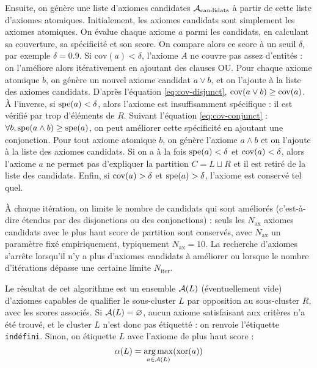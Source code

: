 Ensuite, on génère une liste d'axiomes candidates $\cal{A}_\text{candidats}$ à partir de cette liste d'axiomes atomiques. Initialement, les axiomes candidats sont simplement les axiomes atomiques. On évalue chaque axiome $a$ parmi les candidats, en calculant sa couverture, sa spécificité et son score. On compare alors ce score à un seuil $\delta$, par exemple $\delta = 0.9$. Si $\text{cov}(a) < \delta$, l'axiome $A$ ne couvre pas assez d'entités : on l'améliore alors itérativement en ajoutant des clauses OU. Pour chaque axiome atomique $b$, on génère un nouvel axiome candidat $a \lor b$, et on l'ajoute à la liste des axiomes candidats. D'après l'équation \ref{eq:cov-disjunct}, $\cov(a \lor b) \geq \cov(a)$.
À l'inverse, si $\spe(a) < \delta$, alors l'axiome est insuffisamment spécifique : il est vérifié par trop d'éléments de $R$. Suivant l'équation \ref{eq:cov-conjunct} : $\forall b, \spe(a \land b) \geq \spe(a)$, on peut améliorer cette spécificité en ajoutant une conjonction. Pour tout axiome atomique $b$, on génère l'axiome $a \land b$ et on l'ajoute à la liste des axiomes candidats. 
Si on a à la fois $\spe(a) < \delta$ et $\cov(a) < \delta$, alors l'axiome $a$ ne permet pas d'expliquer la partition $C = L \sqcup R$ et il est retiré de la liste des candidats. Enfin, si $\cov(a) > \delta$ et $\spe(a) > \delta$, l'axiome est conservé tel quel.

À chaque itération, on limite le nombre de candidats qui sont améliorés (c'est-à-dire étendus par des disjonctions ou des conjonctions) : seuls les $N_\text{ax}$ axiomes candidats avec le plus haut score de partition sont conservés, avec $N_\text{ax}$ un paramètre fixé empiriquement, typiquement $N_\text{ax} = 10$. La recherche d'axiomes s'arrête lorsqu'il n'y a plus d'axiomes candidats à améliorer ou lorsque le nombre d'itérations dépasse une certaine limite $N_\text{iter}$.

Le résultat de cet algorithme est un ensemble $\cal{A}(L)$ (éventuellement vide) d'axiomes capables de qualifier le sous-cluster $L$ par opposition au sous-cluster $R$, avec les scores associés. Si $\cal{A}(L) = \varnothing$, aucun axiome satisfaisant aux critères n'a été trouvé, et le cluster $L$ n'est donc pas étiquetté : on renvoie l'étiquette \texttt{indéfini}. Sinon, on étiquette $L$ avec l'axiome de plus haut score :
\begin{equation}
    \alpha(L) = \argmax_{a \in \cal{A}(L)}(\xscore(a))
\end{equation}


